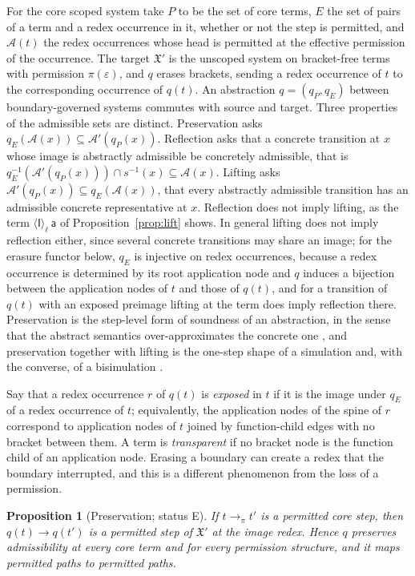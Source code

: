 \documentclass[11pt]{article}
\newtheorem{proposition}[theorem]{Proposition}
\theoremstyle{definition}
\theoremstyle{remark}
\newcommand{\cI}{\mathsf{I}}
\newcommand{\br}[2]{\langle #1\rangle_{#2}}
\newcommand{\Et}{status E}
\begin{document}
For the core scoped system take $P$ to be the set of core terms, $E$ the set of pairs of a term and a redex occurrence in it, whether or not the step is permitted, and $\mathcal A(t)$ the redex occurrences whose head is permitted at the effective permission of the occurrence. The target $\mathfrak X'$ is the unscoped system on bracket-free terms with permission $\pi(\varepsilon)$, and $q$ erases brackets, sending a redex occurrence of $t$ to the corresponding occurrence of $q(t)$. An abstraction $q=(q_P,q_E)$ between boundary-governed systems commutes with source and target. Three properties of the admissible sets are distinct. Preservation asks $q_E(\mathcal A(x))\subseteq\mathcal A'(q_P(x))$. Reflection asks that a concrete transition at $x$ whose image is abstractly admissible be concretely admissible, that is $q_E^{-1}(\mathcal A'(q_P(x)))\cap s^{-1}(x)\subseteq\mathcal A(x)$. Lifting asks $\mathcal A'(q_P(x))\subseteq q_E(\mathcal A(x))$, that every abstractly admissible transition has an admissible concrete representative at $x$. Reflection does not imply lifting, as the term $\br{\cI}\ell\,\mathsf a$ of Proposition~\ref{prop:lift} shows. In general lifting does not imply reflection either, since several concrete transitions may share an image; for the erasure functor below, $q_E$ is injective on redex occurrences, because a redex occurrence is determined by its root application node and $q$ induces a bijection between the application nodes of $t$ and those of $q(t)$, and for a transition of $q(t)$ with an exposed preimage lifting at the term does imply reflection there. Preservation is the step-level form of soundness of an abstraction, in the sense that the abstract semantics over-approximates the concrete one \citep{cousot1977}, and preservation together with lifting is the one-step shape of a simulation and, with the converse, of a bisimulation \citep[Ch.~1]{sangiorgi2011}.

Say that a redex occurrence $r$ of $q(t)$ is \emph{exposed} in $t$ if it is the image under $q_E$ of a redex occurrence of $t$; equivalently, the application nodes of the spine of $r$ correspond to application nodes of $t$ joined by function-child edges with no bracket between them. A term is \emph{transparent} if no bracket node is the function child of an application node. Erasing a boundary can create a redex that the boundary interrupted, and this is a different phenomenon from the loss of a permission.

\begin{proposition}[Preservation; \Et]\label{prop:preserve}
If $t\to_\pi t'$ is a permitted core step, then $q(t)\to q(t')$ is a permitted step of $\mathfrak X'$ at the image redex. Hence $q$ preserves admissibility at every core term and for every permission structure, and it maps permitted paths to permitted paths.
\end{proposition}
\end{document}

